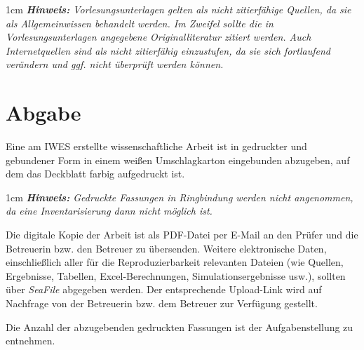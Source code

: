 \begin{addmargin}[1cm]{1cm}
	\textit{\textbf{Hinweis:} Vorlesungsunterlagen gelten als nicht zitierfähige Quellen, da sie als Allgemeinwissen behandelt werden. Im Zweifel sollte die in Vorlesungsunterlagen angegebene Originalliteratur zitiert werden. Auch Internetquellen sind als nicht zitierfähig einzustufen, da sie sich fortlaufend verändern und ggf. nicht überprüft werden können.}
\end{addmargin}


\section{Abgabe}
\label{sec:Abgabe}

Eine am IWES erstellte wissenschaftliche Arbeit ist in gedruckter und gebundener Form in einem weißen Umschlagkarton eingebunden abzugeben, auf dem das Deckblatt farbig aufgedruckt ist. 

\begin{addmargin}[1cm]{1cm}
	\textit{\textbf{Hinweis:} Gedruckte Fassungen in Ringbindung werden nicht angenommen, da eine Inventarisierung dann nicht möglich ist.}
\end{addmargin}


Die digitale Kopie der Arbeit ist als PDF-Datei per E-Mail an den Prüfer und die Betreuerin bzw. den Betreuer zu übersenden. Weitere elektronische Daten, einschließlich aller für die Reproduzierbarkeit relevanten Dateien (wie Quellen, Ergebnisse, Tabellen, Excel-Berechnungen, Simulationsergebnisse usw.), sollten über \textit{SeaFile} abgegeben werden. Der entsprechende Upload-Link wird auf Nachfrage von der Betreuerin bzw. dem Betreuer zur Verfügung gestellt.

Die Anzahl der abzugebenden gedruckten Fassungen ist der Aufgabenstellung zu entnehmen.



